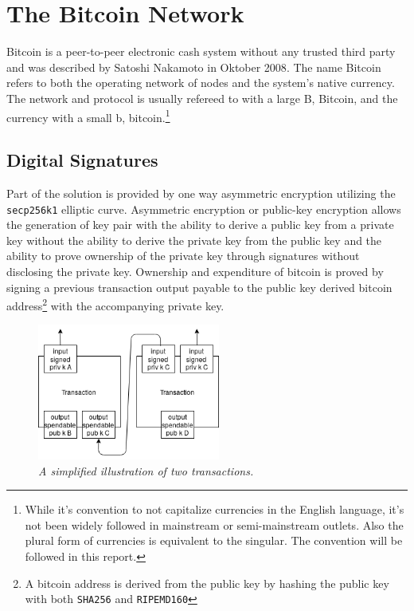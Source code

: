 \chapter{The Bitcoin Network}
	\label{sec:bitcoin}

Bitcoin is a peer-to-peer electronic cash system without any trusted third party and was described by Satoshi Nakamoto in Oktober 2008\cite{nakamoto:bitcoin}. The name Bitcoin refers to both the operating network of nodes and the system's native currency. The network and protocol is usually refereed to with a large B, Bitcoin, and the currency with a small b, bitcoin.\footnote{While it's convention to not capitalize currencies in the English language, it's not been widely followed in mainstream or semi-mainstream outlets. Also the plural form of currencies is equivalent to the singular. The convention will be followed in this report.}

\section{Digital Signatures}

Part of the solution is provided by one way asymmetric encryption utilizing the \texttt{secp256k1} elliptic curve. Asymmetric encryption or public-key encryption allows the generation of key pair with the ability to derive a public key from a private key without the ability to derive the private key from the public key and the ability to prove ownership of the private key through signatures without disclosing the private key. Ownership and expenditure of bitcoin is proved by signing a previous transaction output payable to the public key derived bitcoin address\footnote{A bitcoin address is derived from the public key by hashing the public key with both \texttt{SHA256} and \texttt{RIPEMD160}} with the accompanying private key. 

\begin{figure}[!htb]

	\centering
	\includegraphics[width=6cm]{transaction.png}
	\caption{\textit{A simplified illustration of two transactions. 
	}}
	\label{fig:two:tx}

\end{figure}

